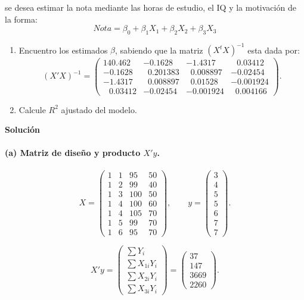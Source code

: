 \documentclass[10pt,a4paper]{article}
\begin{document}
\begin{enumerate}
se desea estimar la nota mediante las horas de estudio, el IQ y la motivación de la forma:
$$Nota = \beta_0 + \beta_1 X_1 + \beta_2 X_2 + \beta_3 X_3$$
\begin{enumerate}
    \item Encuentro los estimados \textbf{$\beta$}, sabiendo que la matriz $(X^tX)^{-1}$ esta dada por:
\[
(X'X)^{-1}=
\begin{pmatrix}
140.462 & -0.1628 & -1.4317 & \;\;\,0.03412\\
-0.1628 & \;\;0.201383 & \;\;0.008897 & -0.02454\\
-1.4317 & \;\;0.008897 & \;\;0.01528 & -0.001924\\
\;\;\,0.03412 & -0.02454 & -0.001924 & \;\;0.004166
\end{pmatrix}.
\]

\item Calcule $R^2$ ajustado del modelo.
\end{enumerate}

\textbf{Solución}

\paragraph{(a) Matriz de diseño y producto \(X'y\).}
\[
X=
\begin{pmatrix}
1 & 1 & 95 & 50\\
1 & 2 & 99 & 40\\
1 & 3 &100 & 50\\
1 & 4 &100 & 60\\
1 & 4 &105 & 70\\
1 & 5 & 99 & 70\\
1 & 6 & 95 & 70
\end{pmatrix},
\qquad
y=
\begin{pmatrix}3\\4\\5\\5\\6\\7\\7\end{pmatrix}.
\]

\[
X'y=
\begin{pmatrix}
\sum Y_i\\
\sum X_{1i}Y_i\\
\sum X_{2i}Y_i\\
\sum X_{3i}Y_i
\end{pmatrix}
=
\begin{pmatrix}
37\\ 147\\ 3669\\ 2260
\end{pmatrix}.
\]


\end{enumerate}
\end{document}
